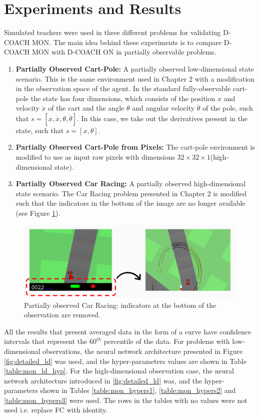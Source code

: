 \section{Experiments and Results}
Simulated teachers were used in three different problems for validating D-COACH MON. The main idea behind these experiments is to compare D-COACH MON with D-COACH ON in partially observable problems.

\begin{enumerate}
    \item \textbf{Partially Observed Cart-Pole:} A partially observed low-dimensional state scenario. This is the same environment used in Chapter 2 with a modification in the observation space of the agent. In the standard fully-observable cart-pole the state has four dimensions, which consists of the position $x$ and velocity $\dot x$ of the cart and the angle $\theta$ and angular velocity $\dot \theta$ of the pole, such that $s=[x, \dot x, \theta, \dot \theta]$. In this case, we take out the derivatives present in the state, such that $s=[x, \theta]$.
    \item \textbf{Partially Observed Cart-Pole from Pixels:} The cart-pole environment is modified to use as input raw pixels with dimensions $32\times32\times1$(high-dimensional state). 
    \item \textbf{Partially Observed Car Racing:} A partially observed high-dimensional state scenario. The Car Racing problem presented in Chapter 2 is modified such that the indicators in the bottom of the image are no longer available (see Figure \ref{fig:no_inds_car_racing}). 
\end{enumerate}

\begin{figure}[h]
    \centering
    \includegraphics[width=0.7\linewidth]{imagenes/cap4/car_racing_no_inds.PNG}
    \caption[Partially observed Car Racing.]{Partially observed Car Racing: indicators at the bottom of the observation are removed.}
    \label{fig:no_inds_car_racing}
\end{figure}

All the results that present averaged data in the form of a curve have confidence intervals that represent the $60^{th}$ percentile of the data. For problems with low-dimensional observations, the neural network architecture presented in Figure \ref{fig:detailed_ld} was used, and the hyper-parameters values are shown in Table \ref{table:mon_ld_hyp}. For the high-dimensional observation case, the neural network architecture introduced in \ref{fig:detailed_ld} was, and the hyper-parameters shown in Tables \ref{table:mon_hypers1}, \ref{table:mon_hypers2} and \ref{table:mon_hypers3} were used. The rows in the tables with no values were not used i.e. replace FC with identity.

